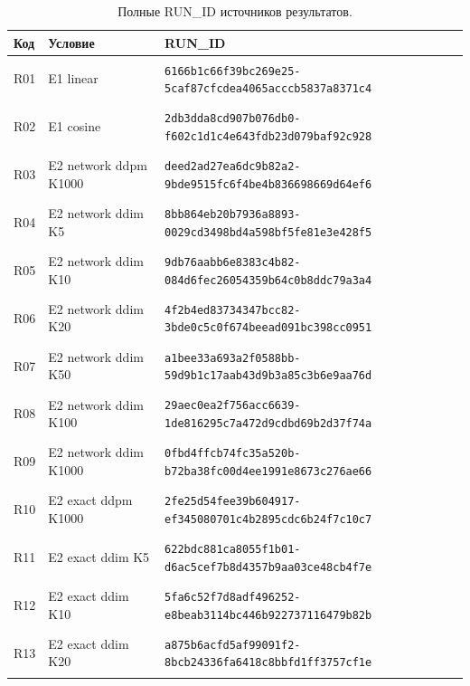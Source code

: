 \begin{longtable}{@{}l>{\raggedright\arraybackslash}p{3.5cm}p{10.8cm}@{}}
\caption{Полные RUN\_ID источников результатов.}\\
\toprule Код & Условие & RUN\_ID \\ \midrule \endhead
\hypertarget{R01}{R01} & E1 linear & {\fontsize{8.8}{11}\selectfont\texttt{6166b1c66f39bc269e25-5caf87cfcdea4065acccb5837a8371c4}} \\
\hypertarget{R02}{R02} & E1 cosine & {\fontsize{8.8}{11}\selectfont\texttt{2db3dda8cd907b076db0-f602c1d1c4e643fdb23d079baf92c928}} \\
\hypertarget{R03}{R03} & E2 network ddpm K1000 & {\fontsize{8.8}{11}\selectfont\texttt{deed2ad27ea6dc9b82a2-9bde9515fc6f4be4b836698669d64ef6}} \\
\hypertarget{R04}{R04} & E2 network ddim K5 & {\fontsize{8.8}{11}\selectfont\texttt{8bb864eb20b7936a8893-0029cd3498bd4a598bf5fe81e3e428f5}} \\
\hypertarget{R05}{R05} & E2 network ddim K10 & {\fontsize{8.8}{11}\selectfont\texttt{9db76aabb6e8383c4b82-084d6fec26054359b64c0b8ddc79a3a4}} \\
\hypertarget{R06}{R06} & E2 network ddim K20 & {\fontsize{8.8}{11}\selectfont\texttt{4f2b4ed83734347bcc82-3bde0c5c0f674beead091bc398cc0951}} \\
\hypertarget{R07}{R07} & E2 network ddim K50 & {\fontsize{8.8}{11}\selectfont\texttt{a1bee33a693a2f0588bb-59d9b1c17aab43d9b3a85c3b6e9aa76d}} \\
\hypertarget{R08}{R08} & E2 network ddim K100 & {\fontsize{8.8}{11}\selectfont\texttt{29aec0ea2f756acc6639-1de816295c7a472d9cdbd69b2d37f74a}} \\
\hypertarget{R09}{R09} & E2 network ddim K1000 & {\fontsize{8.8}{11}\selectfont\texttt{0fbd4ffcb74fc35a520b-b72ba38fc00d4ee1991e8673c276ae66}} \\
\hypertarget{R10}{R10} & E2 exact ddpm K1000 & {\fontsize{8.8}{11}\selectfont\texttt{2fe25d54fee39b604917-ef345080701c4b2895cdc6b24f7c10c7}} \\
\hypertarget{R11}{R11} & E2 exact ddim K5 & {\fontsize{8.8}{11}\selectfont\texttt{622bdc881ca8055f1b01-d6ac5cef7b8d4357b9aa03ce48cb4f7e}} \\
\hypertarget{R12}{R12} & E2 exact ddim K10 & {\fontsize{8.8}{11}\selectfont\texttt{5fa6c52f7d8adf496252-e8beab3114bc446b922737116479b82b}} \\
\hypertarget{R13}{R13} & E2 exact ddim K20 & {\fontsize{8.8}{11}\selectfont\texttt{a875b6acfd5af99091f2-8bcb24336fa6418c8bbfd1ff3757cf1e}} \\

\end{longtable}
